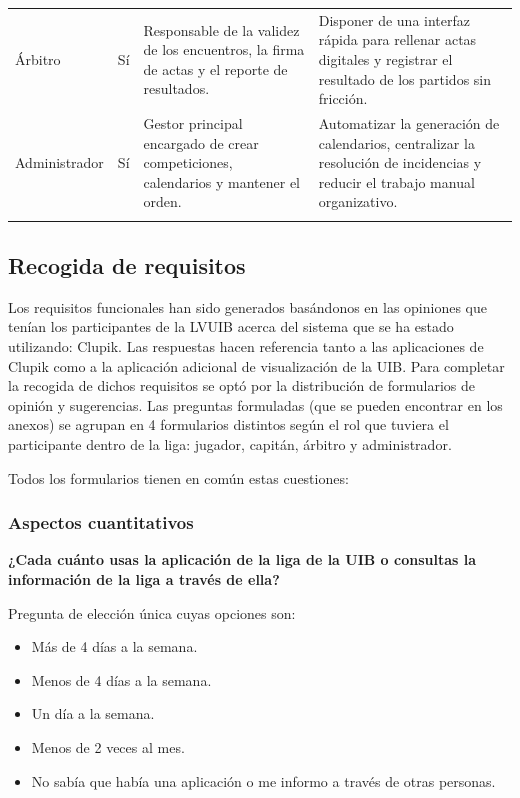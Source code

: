 {\begin{xltabular}{\textwidth}{>{\RaggedRight}p{2cm} c >{\RaggedRight}X >{\RaggedRight}X}
Árbitro & Sí & Responsable de la validez de los encuentros, la firma de actas y el reporte de resultados. & Disponer de una interfaz rápida para rellenar actas digitales y registrar el resultado de los partidos sin fricción. \\ \lightrule
Administrador & Sí & Gestor principal encargado de crear competiciones, calendarios y mantener el orden. & Automatizar la generación de calendarios, centralizar la resolución de incidencias y reducir el trabajo manual organizativo. \\ \lightrule
\end{xltabular}
}

\subsection{Recogida de requisitos}
\label{sec:requirements}

Los requisitos funcionales han sido generados basándonos en las opiniones que tenían los participantes de la \ac{LVUIB} acerca del sistema que se ha estado utilizando: Clupik. Las respuestas hacen referencia tanto a las aplicaciones de Clupik como a la aplicación adicional de visualización de la \ac{UIB}. Para completar la recogida de dichos requisitos se optó por la distribución de formularios de opinión y sugerencias. Las preguntas formuladas (que se pueden encontrar en los anexos) se agrupan en 4 formularios distintos según el rol que tuviera el participante dentro de la liga: jugador, capitán, árbitro y administrador.

Todos los formularios tienen en común estas cuestiones:

\subsubsection*{Aspectos cuantitativos}

\textbf{¿Cada cuánto usas la aplicación de la liga de la UIB o consultas la información de la liga a través de ella?}

Pregunta de elección única cuyas opciones son:

\begin{itemize}
    \item Más de 4 días a la semana.
    \item Menos de 4 días a la semana.
    \item Un día a la semana.
    \item Menos de 2 veces al mes.
    \item No sabía que había una aplicación o me informo a través de otras personas.
\end{itemize}

